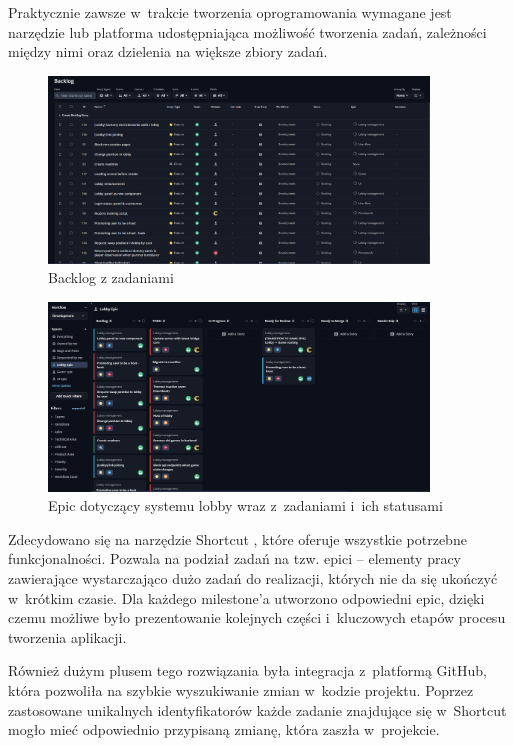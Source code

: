Praktycznie zawsze w~trakcie tworzenia oprogramowania wymagane jest
narzędzie lub platforma udostępniająca możliwość tworzenia zadań,
zależności między nimi oraz dzielenia na większe zbiory zadań.

\begin{figure}[h!]
    \centering
    \includegraphics[width=0.9\textwidth]{img/shortcut/shortcut_backlog.png}
    \caption{Backlog z zadaniami}
\end{figure}

\begin{figure}[h!]
    \centering
    \includegraphics[width=0.9\textwidth]{img/shortcut/shortcut_epic.png}
    \caption{Epic dotyczący systemu lobby wraz z~zadaniami i~ich statusami}
\end{figure}

Zdecydowano się na narzędzie Shortcut \cite{Shortcut}, które oferuje
wszystkie potrzebne funkcjonalności. Pozwala na podział zadań na tzw.
epici -- elementy pracy zawierające wystarczająco dużo zadań do realizacji,
których nie da się ukończyć w~krótkim czasie. Dla każdego milestone'a
utworzono odpowiedni epic, dzięki czemu możliwe było prezentowanie
kolejnych części i~kluczowych etapów procesu tworzenia aplikacji.

\FloatBarrier

Również dużym plusem tego rozwiązania była integracja
z~platformą GitHub\cite{Github}, która pozwoliła na
szybkie wyszukiwanie zmian w~kodzie projektu. Poprzez
zastosowane unikalnych identyfikatorów każde zadanie
znajdujące się w~Shortcut mogło mieć odpowiednio przypisaną
zmianę, która zaszła w~projekcie.


